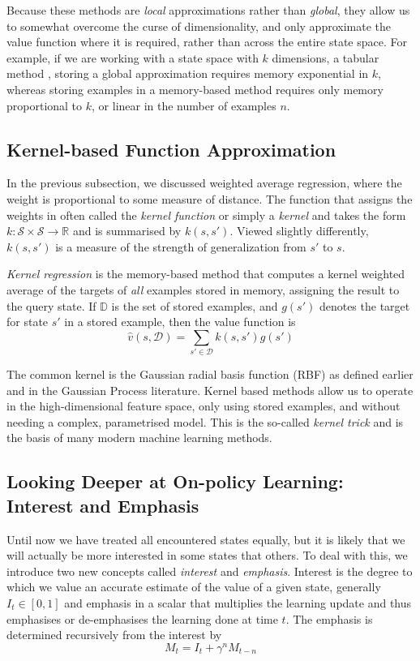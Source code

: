 Because these methods are \textit{local} approximations rather than \textit{global}, they allow us to somewhat overcome the curse of dimensionality, and only approximate the value function where it is required, rather than across the entire state space. For example, if we are working with a state space with $k$ dimensions, a tabular method , storing a global approximation requires memory exponential in $k$, whereas storing examples in a memory-based method requires only memory proportional to $k$, or linear in the number of examples $n$.

\subsection{Kernel-based Function Approximation}
In the previous subsection, we discussed weighted average regression, where the weight is proportional to some measure of distance. The function that assigns the weights in often called the \textit{kernel function} or simply a \textit{kernel} and takes the form $k: \mathcal{S} \times \mathcal{S} \rightarrow \mathbb{R}$ and is summarised by $k(s, s')$. Viewed  slightly differently, $k(s, s')$ is a measure of the strength of generalization from $s'$ to $s$.

\textit{Kernel regression} is the memory-based method that computes a kernel weighted average of the targets of \textit{all} examples stored in memory, assigning the result to the query state. If $\mathbb{D}$ is the set of stored examples, and $g(s')$ denotes the target for state $s'$ in a stored example, then the value function is
\begin{equation}
\hat{v}(s, \mathcal{D}) = \sum_{s' \in \mathcal{D}} k(s, s')g(s')
\end{equation}

The common kernel is the Gaussian radial basis function (RBF) as defined earlier and in the Gaussian Process literature. Kernel based methods allow us to operate in the high-dimensional feature space, only using stored examples, and without needing a complex, parametrised model. This is the so-called \textit{kernel trick} and is the basis of many modern machine learning methods.

\subsection{Looking Deeper at On-policy Learning: Interest and Emphasis}
Until now we have treated all encountered states equally, but it is likely that we will actually be more interested in some states that others. To deal with this, we introduce two new concepts called \textit{interest} and \textit{emphasis}. Interest is the degree to which we value an accurate estimate of the value of a given state, generally $I_t \in [0,1]$ and emphasis in a scalar that multiplies the learning update and thus emphasises or de-emphasises the learning done at time $t$. The emphasis is determined recursively from the interest by
\begin{equation}
M_t = I_t + \gamma^n M_{t-n}
\end{equation}

